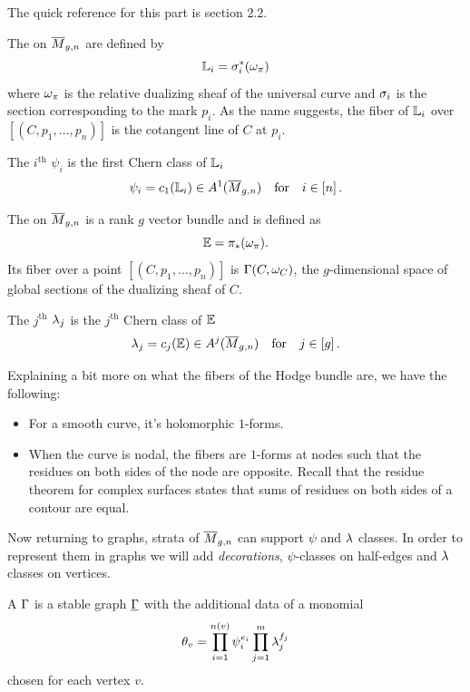 \documentclass[12pt]{memoir}
\begin{document}
The quick reference for this part is \cite{cavalieri2022pseudostablehodgeintegrals} section 2.2. 

\begin{Def}
    The  on $\overline M_{g,n}$ are defined by 
    $$\mathbb{L}_i=\sigma_i^\ast(\omega_\pi)$$
    where $\omega_\pi$ is the relative dualizing sheaf of the universal curve and $\sigma_i$ is the section corresponding to the mark $p_i$. As the name suggests, the fiber of $\mathbb{L}_i$ over $[(C,p_1,\dots,p_n)]$ is the cotangent line of $C$ at $p_i$.\par
    The $i^{\text{th}}$  $\psi_i$ is the first Chern class of $\mathbb{L}_i$
    $$\psi_i=c_1(\mathbb{L}_i)\in A^1(\overline M_{g,n})\quad\text{for}\quad i\in\left\lbrack n\right\rbrack.$$
\end{Def}

\begin{Def}
    The  on $\overline M_{g,n}$ is a rank $g$ vector bundle and is defined as 
    $$\mathbb{E}=\pi_\ast(\omega_\pi).$$
    Its fiber over a point $[(C,p_1,\dots,p_n)]$ is $\Gamma(C,\omega_C)$, the $g$-dimensional space of global sections of the dualizing sheaf of $C$.\par
    The $j^{\text{th}}$  $\lambda_j$ is the $j^{\text{th}}$ Chern class of $\mathbb{E}$
    $$\lambda_j=c_j(\mathbb{E})\in A^j(\overline M_{g,n})\quad\text{for}\quad j\in\left\lbrack g\right\rbrack.$$
\end{Def}

\begin{Rmk}
    Explaining a bit more on what the fibers of the Hodge bundle are, we have the following:
    \begin{itemize}
        \item For a smooth curve, it's holomorphic $1$-forms.
        \item When the curve is nodal, the fibers are $1$-forms at nodes such that the residues on both sides of the node are opposite. Recall that the residue theorem for complex surfaces states that sums of residues on both sides of a contour are equal.
    \end{itemize}
\end{Rmk}

Now returning to graphs, strata of $\overline M_{g,n}$ can support $\psi$ and $\lambda$ classes. In order to represent them in graphs we will add \emph{decorations}, $\psi$-classes on half-edges and $\lambda$ classes on vertices. 

\begin{Def}
    A  $\Gamma$ is a stable graph $\underline{\Gamma}$ with the additional data of a monomial 
    $$\theta_v=\prod_{i=1}^{n(v)}\psi^{e_i}_i\prod_{j=1}^{m}\lambda^{f_j}_j$$
    chosen for each vertex $v$.
\end{Def}
\end{document}
